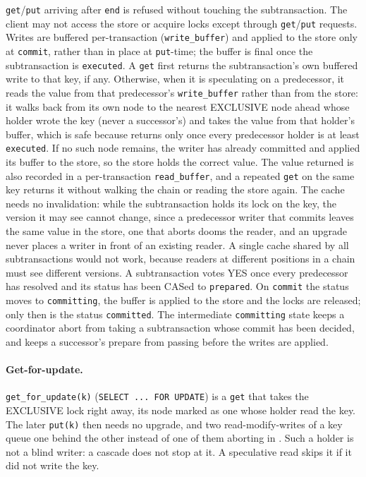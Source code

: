 \documentclass{article}
\begin{document}
\texttt{get}/\texttt{put} arriving after \texttt{end} is refused without touching the subtransaction. The client may not access the store or acquire locks except through \texttt{get}/\texttt{put} requests. Writes are buffered per-transaction (\texttt{write\_buffer}) and applied to the store only at \texttt{commit}, rather than in place at \texttt{put}-time; the buffer is final once the subtransaction is \texttt{executed}. A \texttt{get} first returns the subtransaction's own buffered write to that key, if any. Otherwise, when it is speculating on a predecessor, it reads the value from that predecessor's \texttt{write\_buffer} rather than from the store: it walks back from its own node to the nearest EXCLUSIVE node ahead whose holder wrote the key (never a successor's) and takes the value from that holder's buffer, which is safe because  returns only once every predecessor holder is at least \texttt{executed}. If no such node remains, the writer has already committed and applied its buffer to the store, so the store holds the correct value. The value returned is also recorded in a per-transaction \texttt{read\_buffer}, and a repeated \texttt{get} on the same key returns it without walking the chain or reading the store again. The cache needs no invalidation: while the subtransaction holds its lock on the key, the version it may see cannot change, since a predecessor writer that commits leaves the same value in the store, one that aborts dooms the reader, and an upgrade never places a writer in front of an existing reader. A single cache shared by all subtransactions would not work, because readers at different positions in a chain must see different versions. A subtransaction votes YES once every predecessor has resolved and its status has been CASed to \texttt{prepared}. On \texttt{commit} the status moves to \texttt{committing}, the buffer is applied to the store and the locks are released; only then is the status \texttt{committed}. The intermediate \texttt{committing} state keeps a coordinator abort from taking a subtransaction whose commit has been decided, and keeps a successor's prepare from passing before the writes are applied.

\paragraph{Get-for-update.}
\texttt{get\_for\_update(k)} (\texttt{SELECT ... FOR UPDATE}) is a \texttt{get} that takes the EXCLUSIVE lock right away, its node marked as one whose holder read the key. The later \texttt{put(k)} then needs no upgrade, and two read-modify-writes of a key queue one behind the other instead of one of them aborting in . Such a holder is not a blind writer: a cascade does not stop at it. A speculative read skips it if it did not write the key.
\end{document}
